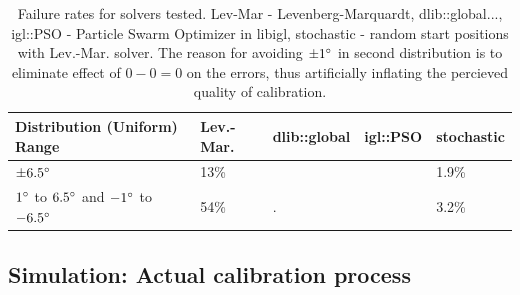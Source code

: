 \documentclass[english, printversion, nomenclature, notitle]{tuvisionthesis} %
\begin{document}
\begin{table}[]
	\begin{tabular}{|l|l|l|l|l|}
		\hline
	Distribution (Uniform) Range & Lev.-Mar.  & dlib::global & igl::PSO & stochastic \\
	\hline
	$\pm6.5\degree$& 13\% &  &  & 1.9\% \\
	$1\degree$ to $6.5\degree$ and $-1\degree$ to $-6.5\degree$	& 54\% & . &  &3.2\% \\ \hline

	\end{tabular}
\caption{Failure rates for solvers tested. Lev-Mar - Levenberg-Marquardt, dlib::global..., igl::PSO - Particle Swarm Optimizer in libigl, stochastic - random start positions with Lev.-Mar. solver. The reason for avoiding $\pm1\degree$ in second distribution is to eliminate effect of $0 - 0 = 0$ on the errors, thus artificially inflating the percieved quality of calibration.}
\end{table}

\begin{center}
  \noindent{}
\end{center}


\subsection{Simulation: Actual calibration process}
\end{document}
